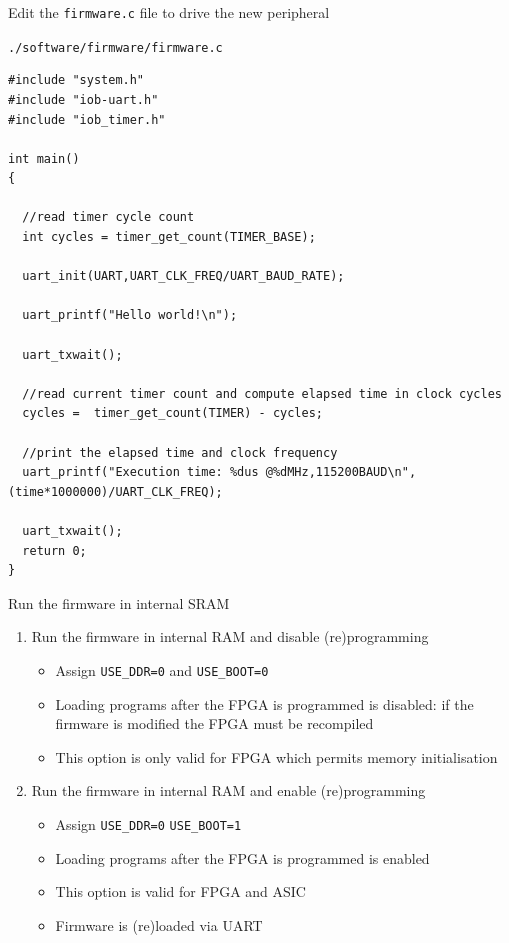 \documentclass [xcolor=svgnames, t] {beamer}
\begin{document}

\begin{frame}[fragile]{Edit the {\tt firmware.c} file to drive the new peripheral}

  {\tt ./software/firmware/firmware.c}
  \begin{tiny}
    \begin{lstlisting}
#include "system.h"
#include "iob-uart.h"
#include "iob_timer.h"

int main()
{ 

  //read timer cycle count
  int cycles = timer_get_count(TIMER_BASE);
  
  uart_init(UART,UART_CLK_FREQ/UART_BAUD_RATE);   

  uart_printf("Hello world!\n");

  uart_txwait();
  
  //read current timer count and compute elapsed time in clock cycles  
  cycles =  timer_get_count(TIMER) - cycles;

  //print the elapsed time and clock frequency
  uart_printf("Execution time: %dus @%dMHz,115200BAUD\n",(time*1000000)/UART_CLK_FREQ);

  uart_txwait();
  return 0;
}
\end{lstlisting}
\end{tiny}
\end{frame}


\begin{frame}{Run the firmware in internal SRAM}
\begin{enumerate}
\item Run the firmware in internal RAM and disable (re)programming
  \begin{itemize}
  \item Assign {\tt USE\_DDR=0} and {\tt USE\_BOOT=0}
  \item Loading programs after the FPGA is programmed is disabled: if the firmware is modified the FPGA must be recompiled
  \item This option is only valid for FPGA which permits memory initialisation
  \end{itemize}
\item Run the firmware in internal RAM and enable (re)programming
  \begin{itemize}
  \item Assign {\tt USE\_DDR=0} {\tt USE\_BOOT=1}
  \item Loading programs after the FPGA is programmed is enabled
  \item This option is valid for FPGA and ASIC
  \item Firmware is (re)loaded via UART
  \end{itemize}
\end{enumerate}
\end{frame}
\end{document}
